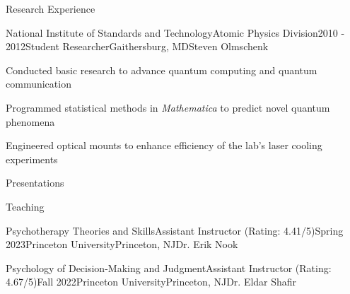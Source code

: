 \documentclass{cv} %
\begin{document}
\begin{cvSection}{Research Experience}

\begin{cvSubsectionResearch}{National Institute of Standards and Technology}{Atomic Physics Division}{2010 - 2012}{Student Researcher}{Gaithersburg, MD}{Steven Olmschenk}
\item Conducted basic research to advance quantum computing and quantum communication
\item Programmed statistical methods in \textit{Mathematica} to predict novel quantum phenomena
\item Engineered optical mounts to enhance efficiency of the lab's laser cooling experiments
\end{cvSubsectionResearch}

\end{cvSection}


\begin{cvSectionEmpty}{Presentations}
   \printbibliography[
     heading=none,
     keyword=talks
   ]
\end{cvSectionEmpty}

\begin{cvSection}{Teaching}
\begin{cvSubsectionTeaching}{Psychotherapy Theories and Skills}{Assistant Instructor (Rating: 4.41/5)}{Spring 2023}{Princeton University}{Princeton, NJ}{Dr. Erik Nook}
\end{cvSubsectionTeaching}

\begin{cvSubsectionTeaching}{Psychology of Decision-Making and Judgment}{Assistant Instructor (Rating: 4.67/5)}{Fall 2022}{Princeton University}{Princeton, NJ}{Dr. Eldar Shafir}
\end{cvSubsectionTeaching}
\end{cvSection}

\pagebreak
\end{document}
